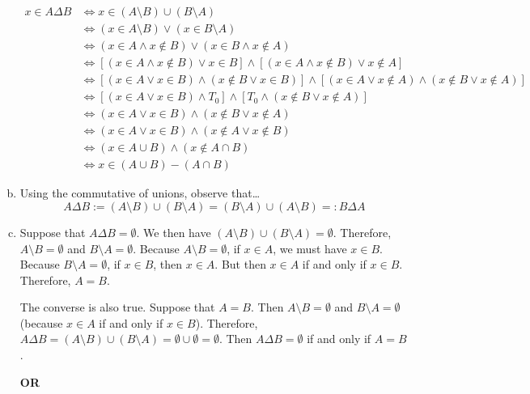 \documentclass[11pt,letterpaper]{article}
\begin{document}
\begin{enumerate}[(a)]
	\[
	\begin{aligned}
	x \in A \Delta B&\Longleftrightarrow x \in (A \setminus B) \cup (B \setminus A) \\
	&\Longleftrightarrow (x \in A \setminus B) \vee (x \in B \setminus A) \\
	&\Longleftrightarrow (x \in A \wedge x \notin B) \vee (x \in B \wedge x \notin A) \\
	&\Longleftrightarrow [(x \in A \wedge x \notin B) \vee x \in B] \wedge [(x \in A \wedge x \notin B) \vee x \notin A] \\
	&\Longleftrightarrow [(x \in A \vee x \in B) \wedge (x \notin B \vee x \in B)] \wedge [(x \in A \vee x \notin A) \wedge (x \notin B \vee x \notin A)] \\
	&\Longleftrightarrow [(x \in A \vee x \in B) \wedge T_0] \wedge [T_0 \wedge (x \notin B \vee x \notin A)] \\
	&\Longleftrightarrow (x \in A \vee x \in B) \wedge (x \notin B \vee x \notin A) \\
	&\Longleftrightarrow (x \in A \vee x \in B) \wedge (x \notin A \vee x \notin B) \\
	&\Longleftrightarrow (x \in A \cup B) \wedge (x \notin A \cap B) \\
	&\Longleftrightarrow x \in (A \cup B) - (A \cap B)
	\end{aligned}
	\] \pspace

\item Using the commutative of unions, observe that\dots
	\[
	A \Delta B:= (A \setminus B) \cup (B \setminus A)= (B \setminus A) \cup (A \setminus B) =: B \Delta A
	\]

\item Suppose that $A \Delta B= \emptyset$. We then have $(A \setminus B) \cup (B \setminus A)= \emptyset$. Therefore, $A \setminus B= \emptyset$ and $B \setminus A= \emptyset$. Because $A \setminus B= \emptyset$, if $x \in A$, we must have $x \in B$. Because $B \setminus A= \emptyset$, if $x \in B$, then $x \in A$. But then $x \in A$ if and only if $x \in B$. Therefore, $A= B$. 

The converse is also true. Suppose that $A= B$. Then $A \setminus B= \emptyset$ and $B \setminus A= \emptyset$ (because $x \in A$ if and only if $x \in B$). Therefore, $A \Delta B= (A \setminus B) \cup (B \setminus A)= \emptyset \cup \emptyset= \emptyset$. Then $A \Delta B= \emptyset$ if and only if $A= B$. 

\begin{center} {\bfseries OR} \end{center}


\end{enumerate}
\end{document}

